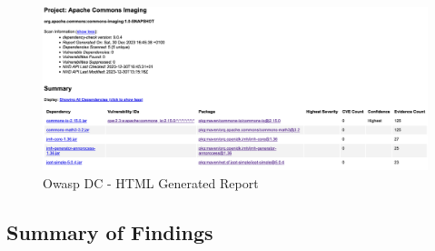 \documentclass[sigconf]{acmart}
\begin{document}
\begin{figure}[h!]
    \centering
    \includegraphics[width=1\linewidth,height=0.7\linewidth]{reportOwaspDC.png}
    \caption{Owasp DC - HTML Generated Report}
    \label{fig:enter-label}
\end{figure}


\subsection{Summary of Findings}
\end{document}
